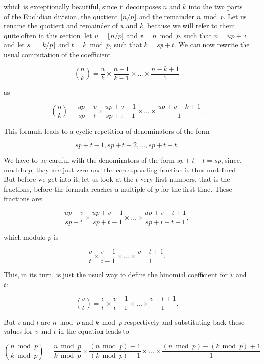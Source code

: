 \documentclass[tikz]{scrreprt}
\begin{document}
which is exceptionally beautiful, since
it decomposes $n$ and $k$
into the two parts of the Euclidian division,
the quotient $\lfloor n/p \rfloor$ and
the remainder $n \bmod p$.
Let us rename the quotient and remainder
of $n$ and $k$, because we will refer
to them quite often in this section:
let $u = \lfloor n/p \rfloor$ and
    $v = n \bmod p$, such that
$n = up + v$, and
let $s = \lfloor k/p \rfloor$ and
    $t = k \bmod p$, such that
$k = sp + t$.
We can now rewrite the 
usual computation of the coefficient

\begin{equation}
\binom{n}{k} = \frac{n}{k} \times \frac{n-1}{k-1} \times \dots \times \frac{n-k+1}{1}
\end{equation}

as

\begin{equation}
\binom{n}{k} = \frac{up + v}{sp+t} \times \frac{up+v-1}{sp+t-1} \times \dots 
        \times \frac{up+v-k+1}{1}.
\end{equation}

This formula leads to a
cyclic repetition of denominators of the form

\[
sp + t - 1, sp + t - 2, \dots, sp + t - t.
\]

We have to be careful with the denominators
of the form $sp + t - t = sp$, since, modulo $p$,
they are just zero and the corresponding
fraction is thus undefined.
But before we get into it, 
let us look at the $t$ very first numbers,
that is the fractions, before the formula
reaches a multiple of $p$ for the first time.
These fractions are:

\[
\frac{up+v}{sp+t} \times
\frac{up+v-1}{sp+t-1} \times \dots \times
\frac{up+v-t+1}{sp+t-t+1},
\]

which modulo $p$ is 

\[
\frac{v}{t} \times
\frac{v-1}{t-1} \times \dots \times
\frac{v-t+1}{1}.
\]

This, in its turn, is just
the usual way to define the
binomial coefficient for $v$ and $t$:

\begin{equation}
\binom{v}{t} = 
\frac{v}{t} \times
\frac{v-1}{t-1} \times \dots \times
\frac{v-t+1}{1}.
\end{equation}

But $v$ and $t$ are
$n \bmod p$ and $k \bmod p$ respectively
and substituting back these values for $v$ and $t$
in the equation leads to

\begin{equation}
\binom{n \bmod p}{k \bmod p} = 
\frac{n \bmod p}{k \bmod p} \times
\frac{(n \bmod p)-1}{(k \bmod p)-1} \times \dots \times
\frac{(n \bmod p)-(k \bmod p)+1}{1}
\end{equation}
\end{document}
